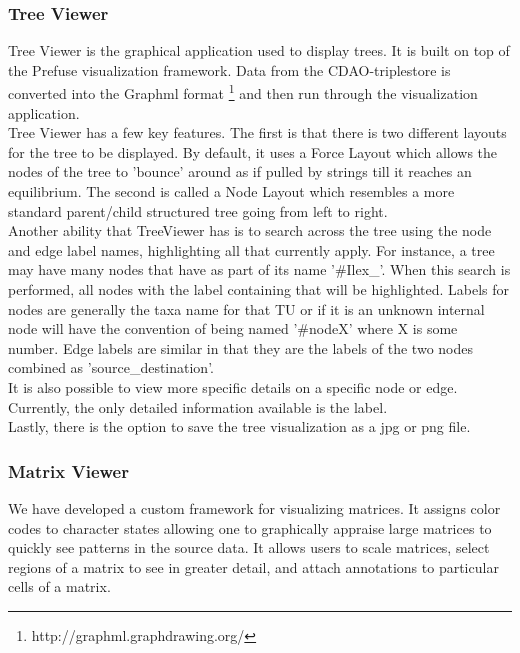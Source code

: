 \documentclass[10pt]{bmc_article}
\newenvironment{bmcformat}{\begin{raggedright}\baselineskip20pt\sloppy\setboolean{publ}{false}}{\end{raggedright}\baselineskip20pt\sloppy}
\begin{document}
\begin{bmcformat}
\subsubsection*{Tree Viewer}
Tree Viewer is the graphical application used to display trees.  It is built on
top of the Prefuse visualization framework. Data from the CDAO-triplestore is
converted into the Graphml format \footnote{http://graphml.graphdrawing.org/}
and then run through the visualization application.  \\ Tree Viewer has a few
key features.  The first is that there is two different layouts for the tree to
be displayed.  By default, it uses a Force Layout which allows the nodes of the
tree to 'bounce' around as if pulled by strings till it reaches an equilibrium.
The second is called a Node Layout which resembles a more standard parent/child
structured tree going from left to right.  \\ Another ability that TreeViewer
has is to search across the tree using the node and edge label names,
highlighting all that currently apply.  For instance, a tree may have many
nodes that have as part of its name '\#Ilex\_'.  When this search is performed,
all nodes with the label containing that will be highlighted.  Labels for nodes
are generally the taxa name for that TU or if it is an unknown internal node
will have the convention of being named '\#nodeX' where X is some number.  Edge
labels are similar in that they are the labels of the two nodes combined as
'source\_destination'.  \\ 
It is also possible to view more specific details on
a specific node or edge.  Currently, the only detailed information available is
the label.  \\
 Lastly, there is the option to save the tree visualization as a
jpg or png file.  

\subsubsection*{Matrix Viewer} We have developed  a custom
framework for visualizing matrices. It assigns color codes to character states
allowing one to graphically appraise large matrices to quickly see patterns in
the source data. It allows users to scale matrices, select regions of a matrix
to see in greater detail, and attach annotations to particular cells of a
matrix. 
  

\end{bmcformat}
\end{document}
